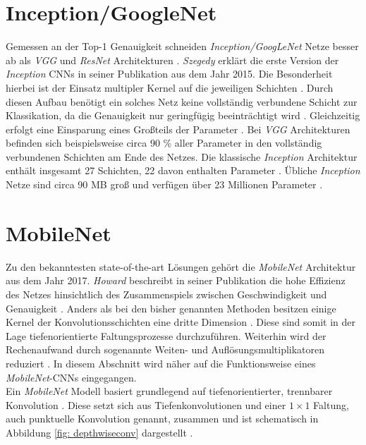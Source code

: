 		\section*{Inception/GoogleNet}
		\label{subsec: inception}
		Gemessen an der Top-1 Genauigkeit schneiden \textit{Inception/GoogLeNet} Netze besser ab als \textit{VGG} und \textit{ResNet} Architekturen \cite{cnnvergleich}. \textit{Szegedy} erklärt die erste Version der \textit{Inception} CNNs in seiner Publikation \cite{inception} aus dem Jahr 2015. Die Besonderheit hierbei ist der Einsatz multipler Kernel auf die jeweiligen Schichten \cite{inception}. Durch diesen Aufbau benötigt ein solches Netz keine vollständig verbundene Schicht zur Klassikation, da die Genauigkeit nur geringfügig beeinträchtigt wird \cite{inception}. Gleichzeitig erfolgt eine Einsparung eines Großteils der Parameter \cite{inception}. Bei \textit{VGG} Architekturen befinden sich beispielsweise circa 90 \% aller Parameter in den vollständig verbundenen Schichten am Ende des Netzes. Die klassische \textit{Inception} Architektur enthält insgesamt 27 Schichten, 22 davon enthalten Parameter \cite{inception}. Übliche \textit{Inception} Netze sind circa 90 MB groß und verfügen über 23 Millionen Parameter \cite{keras}.\\ 
		

		
		\section*{MobileNet}
		\label{subsec: mobilenets}
		Zu den bekanntesten state-of-the-art Lösungen gehört die \textit{MobileNet} Architektur aus dem Jahr 2017. \textit{Howard} beschreibt in seiner Publikation die hohe Effizienz des Netzes hinsichtlich des Zusammenspiels zwischen Geschwindigkeit und Genauigkeit \cite{mobilenets}. Anders als bei den bisher genannten Methoden besitzen einige Kernel der Konvolutionsschichten eine dritte Dimension \cite{mobilenets}. Diese sind somit in der Lage tiefenorientierte Faltungsprozesse durchzuführen. Weiterhin wird der Rechenaufwand durch sogenannte Weiten- und Auflösungsmultiplikatoren reduziert \cite{mobilenets}. In diesem Abschnitt wird näher auf die Funktionsweise eines \textit{MobileNet}-CNNs eingegangen.\\
		
		
		
		
		Ein \textit{MobileNet} Modell basiert grundlegend auf tiefenorientierter, trennbarer Konvolution \cite{mobilenets}. Diese setzt sich aus Tiefenkonvolutionen und einer $1\times1$ Faltung, auch punktuelle Konvolution genannt, zusammen und ist schematisch in Abbildung \ref{fig: depthwiseconv} dargestellt \cite{mobilenets}.\\
		
